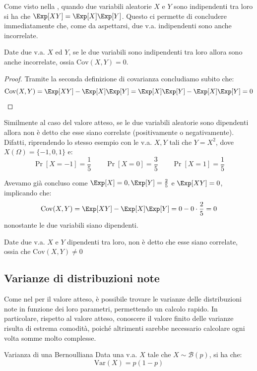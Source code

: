 \documentclass[a4paper, 12pt]{report}
\begin{document}
    Come visto nella , quando due variabili aleatorie $X$ e $Y$ sono indipendenti tra loro si ha che $\Exp[XY] = \Exp[X]\Exp[Y]$. Questo ci permette di concludere immediatamente che, come da aspettarsi, due v.a. indipendenti sono anche incorrelate.

    \begin{framedthm}{}
        Date due v.a. $X$ ed $Y$, se le due variabili sono indipendenti tra loro allora sono anche incorrelate, ossia $\mathrm{Cov}(X,Y) = 0$.
    \end{framedthm}

    \begin{proof}
        Tramite la seconda definizione di covarianza concludiamo subito che:
        \[\mathrm{Cov}(X,Y) = \Exp[XY] - \Exp[X]\Exp[Y] = \Exp[X]\Exp[Y] - \Exp[X]\Exp[Y] = 0\]
    \end{proof}

    Similmente al caso del valore atteso, se le due variabili aleatorie sono dipendenti allora non è detto che esse siano correlate (positivamente o negativamente). Difatti, riprendendo lo stesso esempio con le v.a. $X, Y$ tali che $Y = X^2$, dove $X(\Omega) = \{-1,0,1\}$ e:
    \[\Pr[X = -1] = \frac{1}{5} \qquad \Pr[X = 0] = \frac{3}{5} \qquad \Pr[X = 1] = \frac{1}{5}\]

    Avevamo già concluso come $\Exp[X] = 0, \Exp[Y] = \frac{2}{5}$ e $\Exp[XY] = 0$, implicando che:
    \[\mathrm{Cov}(X,Y) = \Exp[XY] - \Exp[X]\Exp[Y] = 0 - 0 \cdot \frac{2}{5} = 0\]
    nonostante le due variabili siano dipendenti.
    
    \begin{framedobs}{}
        Date due v.a. $X$ e $Y$ dipendenti tra loro, non è detto che esse siano correlate, ossia che $\mathrm{Cov}(X,Y) \neq 0$
    \end{framedobs}

    \subsection{Varianze di distribuzioni note}

    Come nel per il valore atteso, è possibile trovare le varianze delle distribuzioni note in funzione dei loro parametri, permettendo un calcolo rapido. In particolare, rispetto al valore atteso, conoscere il valore finito delle varianze risulta di estrema comodità, poiché altrimenti sarebbe necessario calcolare ogni volta somme molto complesse.

    \begin{framedprop}{Varianza di una Bernoulliana}
        Data una v.a. $X$ tale che $X \sim \mathcal{B}(p)$, si ha che:
        \[\mathrm{Var}(X) = p(1-p)\]
    \end{framedprop}
\end{document}
